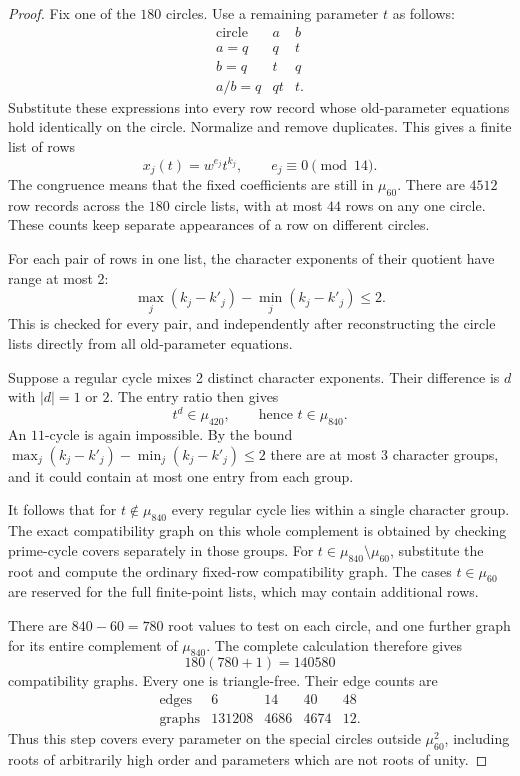 \documentclass[11pt,a4paper]{article}
\theoremstyle{plain}
\theoremstyle{definition}
\theoremstyle{plain}
\begin{document}
\begin{proof}
Fix one of the $180$ circles. Use a remaining parameter $t$ as follows:
\[
\begin{array}{c|cc}
\text{circle}&a&b\\\hline
a=q&q&t\\
b=q&t&q\\
a/b=q&qt&t.
\end{array}
\]
Substitute these expressions into every row record whose old-parameter equations hold identically on the circle. Normalize and remove duplicates. This gives a finite list of rows
\[
x_j(t)=w^{e_j}t^{k_j},\qquad e_j\equiv0\pmod{14}.
\]
The congruence means that the fixed coefficients are still in $\mu_{60}$. There are $4512$ row records across the $180$ circle lists, with at most $44$ rows on any one circle. These counts keep separate appearances of a row on different circles.

For each pair of rows in one list, the character exponents of their quotient have range at most 2:
\[
\max_j(k_j-k'_j)-\min_j(k_j-k'_j)\le2.
\]
This is checked for every pair, and independently after reconstructing the circle lists directly from all old-parameter equations.

Suppose a regular cycle mixes 2 distinct character exponents. Their difference is $d$ with $|d|=1$ or $2$. The entry ratio then gives
$$t^d\in\mu_{420},\qquad\text{hence }t\in\mu_{840}.$$
An $11$-cycle is again impossible. By the bound $\max_j(k_j-k'_j)-\min_j(k_j-k'_j)\le2$ there are at most 3 character groups, and it could contain at most one entry from each group.

It follows that for $t\notin\mu_{840}$ every regular cycle lies within a single character group. The exact compatibility graph on this whole complement is obtained by checking prime-cycle covers separately in those groups. For $t\in\mu_{840}\setminus\mu_{60}$, substitute the root and compute the ordinary fixed-row compatibility graph. The cases $t\in\mu_{60}$ are reserved for the full finite-point lists, which may contain additional rows.

There are $840-60=780$ root values to test on each circle, and one further graph for its entire complement of $\mu_{840}$. The complete calculation therefore gives
\[
180(780+1)=140580
\]
compatibility graphs. Every one is triangle-free. Their edge counts are
$$\begin{array}{c|rrrr}
\text{edges}&6&14&40&48\\\hline
\text{graphs}&131208&4686&4674&12.
\end{array}$$
Thus this step covers every parameter on the special circles outside $\mu_{60}^2$, including roots of arbitrarily high order and parameters which are not roots of unity.


\end{proof}
\end{document}
